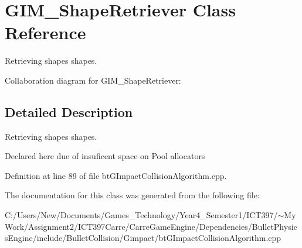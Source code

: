 \hypertarget{class_g_i_m___shape_retriever}{
\section{GIM\_\-ShapeRetriever Class Reference}
\label{class_g_i_m___shape_retriever}
}
Retrieving shapes shapes.  


Collaboration diagram for GIM\_\-ShapeRetriever:

\subsection{Detailed Description}
Retrieving shapes shapes. 

Declared here due of insuficent space on Pool allocators 

Definition at line 89 of file btGImpactCollisionAlgorithm.cpp.

The documentation for this class was generated from the following file:\begin{CompactItemize}
\item 
C:/Users/New/Documents/Games\_\-Technology/Year4\_\-Semester1/ICT397/$\sim$My Work/Assignment2/ICT397Carre/CarreGameEngine/Dependencies/BulletPhysicsEngine/include/BulletCollision/Gimpact/btGImpactCollisionAlgorithm.cpp\end{CompactItemize}
